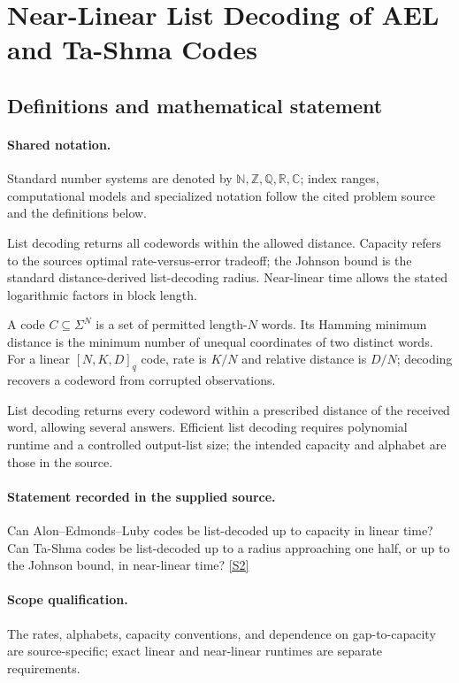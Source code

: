 \documentclass[11pt]{article}
\newcommand{\sref}[2]{\hyperlink{source:#1:#2}{[S#2]}}
\begin{document}
\section{Near-Linear List Decoding of AEL and Ta-Shma Codes}\label{statement}

\subsection{Definitions and mathematical statement}

\paragraph{Shared notation.}Standard number systems are denoted by $\mathbb N,\mathbb Z,\mathbb Q,\mathbb R,\mathbb C$; index ranges, computational models and specialized notation follow the cited problem source and the definitions below.


List decoding returns all codewords within the allowed distance. Capacity refers to the source\textquotesingle s optimal rate-versus-error tradeoff; the Johnson bound is the standard distance-derived list-decoding radius. Near-linear time allows the stated logarithmic factors in block length.

A code $C\subseteq\Sigma^N$ is a set of permitted length-$N$ words. Its Hamming minimum distance is the minimum number of unequal coordinates of two distinct words. For a linear $[N,K,D]_q$ code, rate is $K/N$ and relative distance is $D/N$; decoding recovers a codeword from corrupted observations.

List decoding returns every codeword within a prescribed distance of the received word, allowing several answers. Efficient list decoding requires polynomial runtime and a controlled output-list size; the intended capacity and alphabet are those in the source.
\paragraph{Statement recorded in the supplied source.}
Can Alon–Edmonds–Luby codes be list-decoded up to capacity in linear time? Can Ta-Shma codes be list-decoded up to a radius approaching one half, or up to the Johnson bound, in near-linear time? \sref{statement}{2}
\paragraph{Scope qualification.}
The rates, alphabets, capacity conventions, and dependence on gap-to-capacity are source-specific; exact linear and near-linear runtimes are separate requirements.
\end{document}

